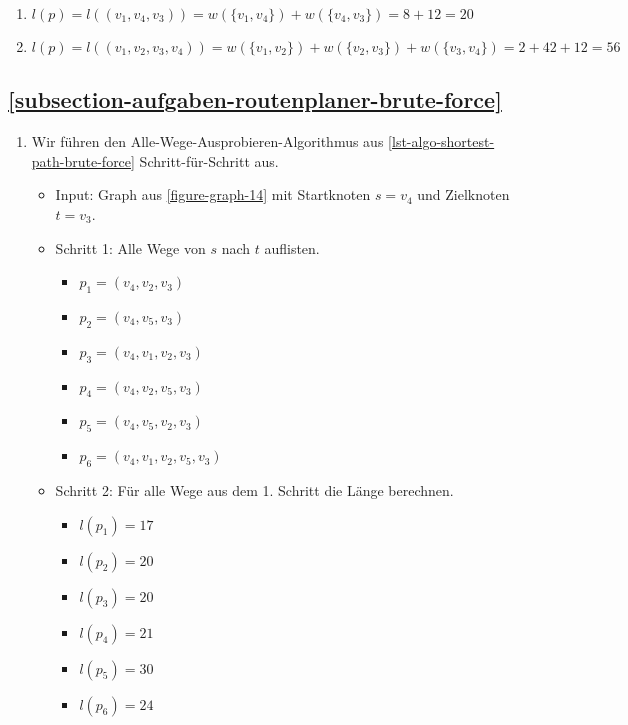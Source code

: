 \begin{enumerate}
	\item $l(p) = l((v_1, v_4, v_3)) = w(\{v_1, v_4\}) + w(\{v_4, v_3\}) = 8 + 12 = 20$
	\item $l(p) = l((v_1, v_2, v_3, v_4)) = w(\{v_1, v_2\}) + w(\{v_2, v_3\}) + w(\{v_3, v_4\}) = 2 + 42 + 12 = 56$
\end{enumerate}

\subsection*{\ref{subsection-aufgaben-routenplaner-brute-force} }

\begin{enumerate}
	\item Wir führen den Alle-Wege-Ausprobieren-Algorithmus aus \autoref{lst-algo-shortest-path-brute-force} Schritt-für-Schritt aus.	

\begin{itemize}
\item Input: Graph aus \autoref{figure-graph-14} mit Startknoten $s = v_4$ und Zielknoten $t = v_3$.
\item Schritt 1: Alle Wege von $s$ nach $t$ auflisten.

\begin{itemize}
	\item $p_1 = (v_4, v_2, v_3)$
	\item $p_2 = (v_4, v_5, v_3)$
	\item $p_3 = (v_4, v_1, v_2, v_3)$
	\item $p_4 = (v_4, v_2, v_5, v_3)$
	\item $p_5 = (v_4, v_5, v_2, v_3)$
	\item $p_6 = (v_4, v_1, v_2, v_5, v_3)$
\end{itemize}

\item Schritt 2: Für alle Wege aus dem 1. Schritt die Länge berechnen.

\begin{itemize}
\item $l(p_1) = 17$
\item $l(p_2) = 20$
\item $l(p_3) = 20$
\item $l(p_4) = 21$
\item $l(p_5) = 30$
\item $l(p_6) = 24$
\end{itemize}


\end{itemize}
\end{enumerate}

